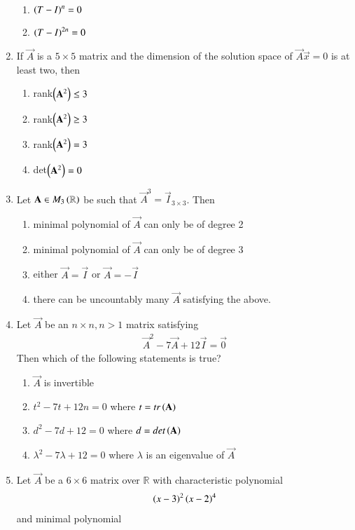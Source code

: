 \begin{enumerate}[label=\thesection.\arabic*.,ref=\thesection.\theenumi]
\begin{enumerate}
\item $\left(T-I\right)^{n} = 0$ 
\item $\left(T-I\right)^{2n} = 0$ 
\end{enumerate}
%
\item If $\vec{A}$ is a $5\times 5$ matrix and the dimension of the solution space of $\vec{A}\vec{x} = 0$ is at least two, then
\begin{enumerate}
\item rank$\left(\mathbf{A}^2\right) \le 3$ 
\item rank$\left(\mathbf{A}^2\right) \ge 3$ 
\item rank$\left(\mathbf{A}^2\right) = 3$ 
\item det$\left(\mathbf{A}^2\right) = 0$ 
\end{enumerate}
%
\item Let $\mathbf{A} \in M_3\left(\mathbb{R}\right)$ be such that $\vec{A}^3 = \vec{I}_{3\times 3}$.  Then
\begin{enumerate}
\item minimal polynomial of $\vec{A}$ can only be of degree 2
\item minimal polynomial of $\vec{A}$ can only be of degree 3
\item either $\vec{A} = \vec{I}$ or $\vec{A} = -\vec{I}$
\item there can be uncountably many $\vec{A}$ satisfying the above.
\end{enumerate}
%
\item Let $\vec{A}$ be an $n \times n, n > 1$ matrix satisfying
\begin{align}
\vec{A}^2 - 7\vec{A} + 12\vec{I} = \vec{0}
\end{align}
%
Then which of the following statements is true?
\begin{enumerate}
\item  $\vec{A}$ is invertible
\item $t^2-7t+12n = 0$ where $t = tr\left(\mathbf{A}\right)$
\item $d^2-7d+12 = 0$ where $d = det\left(\mathbf{A}\right)$
\item $\lambda^2-7\lambda+12 = 0$ where $\lambda$ is an eigenvalue of $\vec{A}$
\end{enumerate}
%
%
\item Let $\vec{A}$ be a $6 \times 6$ matrix over $\mathbb{R}$ with characteristic polynomial
%
\begin{align}
\left(x-3\right)^2
\left(x-2\right)^4
\end{align}
%
and minimal polynomial
%
\begin{align}

\end{align}
\end{enumerate}
